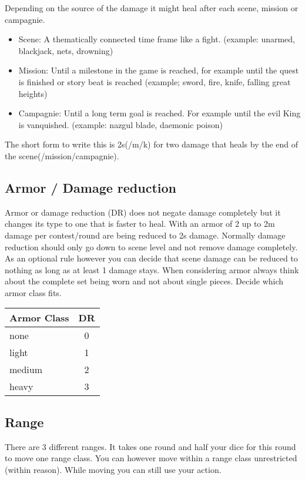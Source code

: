 \documentclass[11pt]{article}
\begin{document}
{\begin{multicols}{2}[]
Depending on the source of the damage it might heal after each scene, mission or campagnie.
\begin{itemize}
\item Scene: A thematically connected time frame like a fight. (example: unarmed, blackjack, nets, drowning)
\item Mission: Until a milestone in the game is reached, for example until the quest is finished or story beat is reached (example; sword, fire, knife, falling great heights)
\item Campagnie: Until a long term goal is reached. For example until the evil King is vanquished. (example: nazgul blade, daemonic poison)
\end{itemize}
The short form to write this is 2s(/m/k) for two damage that heals by the end of the scene(/mission/campagnie).

\subsection{Armor / Damage reduction}
\label{sec:orgad9e069}
Armor or damage reduction (DR) does not negate damage completely but it changes its type to one that is faster to heal. With an armor of 2 up to 2m damage per contest/round are being reduced to 2s damage. Normally damage reduction should only go down to scene level and not remove damage completely. As an optional rule however you can decide that scene damage can be reduced to nothing as long as at least 1 damage stays. When considering armor always think about the complete set being worn and not about single pieces. Decide which armor class fits.

\begin{center}
\begin{tabular}{l|c}
\textbf{Armor Class} & \textbf{DR}\\
\hline
none & 0\\
light & 1\\
medium & 2\\
heavy & 3\\
\end{tabular}
\end{center}

\subsection{Range}
\label{sec:org2a02386}
There are 3 different ranges. It takes one round and half your dice for this round to move one range class. You can however move within a range class unrestricted (within reason). While moving you can still use your action.


\end{multicols}}
\end{document}
